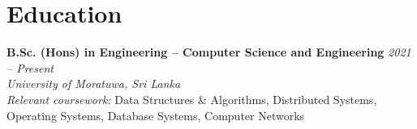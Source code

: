 \section*{Education}
\BigDivider
\noindent
\textbf{B.Sc. (Hons) in Engineering – Computer Science and Engineering}
\hfill \textit{2021 -- Present}\\
\textit{University of Moratuwa, Sri Lanka} \\
\textit{Relevant coursework:} Data Structures \& Algorithms, Distributed Systems, Operating Systems, Database Systems, Computer Networks
